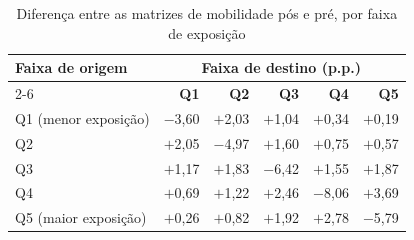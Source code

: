 \begin{table}[htb]
  \caption{Diferença entre as matrizes de mobilidade pós e pré, por faixa de exposição}
  \label{tab:matriz}
  \centering
  \espacosimples\idpcorpodez
  \begin{tabular}{@{}lrrrrr@{}}
    \toprule
    \textbf{Faixa de origem} & \multicolumn{5}{c}{\textbf{Faixa de destino (p.p.)}} \\
    \cmidrule(l){2-6}
     & \textbf{Q1} & \textbf{Q2} & \textbf{Q3} & \textbf{Q4} & \textbf{Q5} \\
    \midrule
    Q1 (menor exposição) & $-$3,60  & $+$2,03  & $+$1,04  & $+$0,34  & $+$0,19 \\
    Q2                   & $+$2,05  & $-$4,97  & $+$1,60  & $+$0,75  & $+$0,57 \\
    Q3                   & $+$1,17  & $+$1,83  & $-$6,42  & $+$1,55  & $+$1,87 \\
    Q4                   & $+$0,69  & $+$1,22  & $+$2,46  & $-$8,06  & $+$3,69 \\
    Q5 (maior exposição) & $+$0,26  & $+$0,82  & $+$1,92  & $+$2,78  & $-$5,79 \\
    \bottomrule
  \end{tabular}
\end{table}
